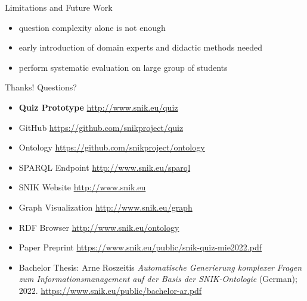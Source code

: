 \documentclass[aspectratio=1610,12pt]{beamer}
\begin{document}
\begin{frame}[fragile]{Limitations and Future Work}
\begin{itemize}
\item question complexity alone is not enough
\item early introduction of domain experts and didactic methods needed
\item perform systematic evaluation on large group of students
\end{itemize}
\end{frame}

\begin{frame}[fragile]{Thanks! Questions?}
\begin{itemize}
\vspace{0.5em}%
\item \textbf{Quiz Prototype} \url{http://www.snik.eu/quiz}
\item GitHub \url{https://github.com/snikproject/quiz}
\item Ontology \url{https://github.com/snikproject/ontology}
\item SPARQL Endpoint \url{http://www.snik.eu/sparql}
\item SNIK Website \url{http://www.snik.eu}
\item Graph Visualization \url{http://www.snik.eu/graph}
\item RDF Browser \url{http://www.snik.eu/ontology}
\item Paper Preprint \url{https://www.snik.eu/public/snik-quiz-mie2022.pdf}
\item Bachelor Thesis: Arne Roszeitis \emph{Automatische Generierung komplexer Fragen zum Informationsmanagement auf der Basis der SNIK-Ontologie} (German); 2022. \url{https://www.snik.eu/public/bachelor-ar.pdf}
\end{itemize}
\end{frame}
\end{document}
